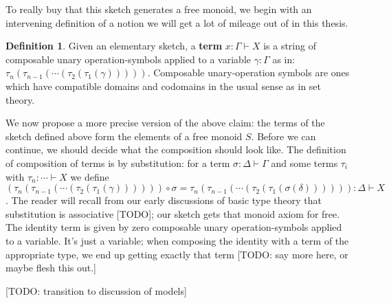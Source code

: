 \documentclass[12pt,twoside]{reedthesis}
\theoremstyle{definition}
\newtheorem{definition}{Definition}
\theoremstyle{remark}
\theoremstyle{theorem}
\begin{document}
To really buy that this sketch generates a free monoid, we begin with an
intervening definition of a notion we will get a lot of mileage out of in this
thesis.
\begin{definition}\label{def:term}
  Given an elementary sketch, a \textbf{term} $x : \Gamma \vdash X$ is a string of
  composable unary operation-symbols applied to a variable $\gamma : \Gamma$ as in:
  \( \tau_{n} (\tau_{n-1} (\cdots (\tau_{2}(\tau_{1}(\gamma))))) \). Composable unary-operation
  symbols are ones which have compatible domains and codomains in the usual
  sense as in set theory.
\end{definition}
We now propose a more precise version of the above claim: the terms of the
sketch defined above form the elements of a free monoid \( S \). Before we can
continue, we should decide what the composition should look like. The definition
of composition of terms is by substitution: for a term \( \sigma : \Delta \vdash \Gamma\) and some
terms \( \tau_{i}\) with \( \tau_{n} : \cdots \vdash X \) we define
\[ (\tau_{n} (\tau_{n-1} (\cdots (\tau_{2}(\tau_{1}(\gamma)))))) \circ \sigma = \tau_{n} (\tau_{n-1} (\cdots (\tau_{2}(\tau_{1}(\sigma(\delta)))))) : \Delta \vdash X \].
The reader will recall from our early discussions of basic type theory that
substitution is associative [TODO]; our sketch gets that monoid axiom for free. The
identity term is given by zero composable unary operation-symbols applied to a
variable. It's just a variable; when composing the identity with a term of the
appropriate type, we end up getting exactly that term [TODO: say more here, or maybe
flesh this out.]

  [TODO: transition to discussion of models]

\end{document}
